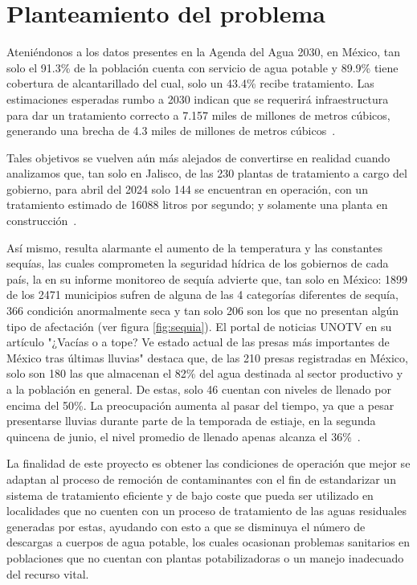 \section{Planteamiento del problema}
Ateniéndonos a los datos presentes en la Agenda del Agua 2030, en México, tan solo el 91.3\% de la población cuenta con servicio de agua potable y 89.9\% tiene cobertura de alcantarillado del cual, solo un 43.4\% recibe tratamiento. Las estimaciones esperadas rumbo a 2030 indican que se requerirá infraestructura para dar un tratamiento correcto a 7.157 miles de millones de metros cúbicos, generando una brecha de 4.3 miles de millones de metros cúbicos~\citep{aa2030}.\par
Tales objetivos se vuelven aún más alejados de convertirse en realidad cuando analizamos que, tan solo en Jalisco, de las 230 plantas de tratamiento a cargo del gobierno, para abril del 2024 solo 144 se encuentran en operación, con un tratamiento estimado de 16088 litros por segundo; y solamente una planta en construcción~\citep{CEAJ24}.\par
Así mismo, resulta alarmante el aumento de la temperatura y las constantes sequías, las cuales comprometen la seguridad hídrica de los gobiernos de cada país, la \citep{CNA2024} en su informe monitoreo de sequía advierte que, tan solo en México: 1899 de los 2471 municipios sufren de alguna de las 4 categorías diferentes de sequía, 366 condición anormalmente seca y tan solo 206 son los que no presentan algún tipo de afectación (ver figura \ref{fig:sequia}). El portal de noticias UNOTV en su artículo "¿Vacías o a tope? Ve estado actual de las presas más importantes de México tras últimas lluvias" destaca que, de las 210 presas registradas en México, solo son 180 las que almacenan el 82\% del agua destinada al sector productivo y a la población en general. De estas, solo 46 cuentan con niveles de llenado por encima del 50\%. La preocupación aumenta al pasar del tiempo, ya que a pesar presentarse lluvias durante parte de la temporada de estiaje, en la segunda quincena de junio, el nivel promedio de llenado apenas alcanza el 36\%~\citep{Cruz2024}. \par
La finalidad de este proyecto es obtener las condiciones de operación que mejor se adaptan al proceso de remoción de contaminantes con el fin de estandarizar un sistema de tratamiento eficiente y de bajo coste que pueda ser utilizado en localidades que no cuenten con un proceso de tratamiento de las aguas residuales generadas por estas, ayudando con esto a que se disminuya el número de descargas a cuerpos de agua potable, los cuales ocasionan problemas sanitarios en poblaciones que no cuentan con plantas potabilizadoras o un manejo inadecuado del recurso vital.\par
